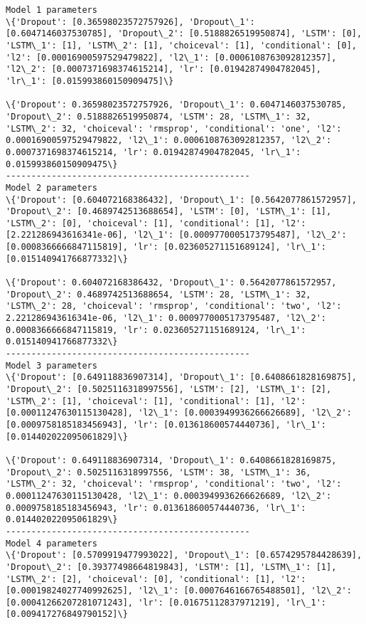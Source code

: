 \documentclass[11pt]{article}
\begin{document}
    \begin{Verbatim}[commandchars=\\\{\}]
Model 1 parameters
\{'Dropout': [0.36598023572757926], 'Dropout\_1': [0.6047146037530785], 'Dropout\_2': [0.5188826519950874], 'LSTM': [0], 'LSTM\_1': [1], 'LSTM\_2': [1], 'choiceval': [1], 'conditional': [0], 'l2': [0.00016900597529479822], 'l2\_1': [0.0006108763092812357], 'l2\_2': [0.0007371698374615214], 'lr': [0.01942874904782045], 'lr\_1': [0.015993860150909475]\}

\{'Dropout': 0.36598023572757926, 'Dropout\_1': 0.6047146037530785, 'Dropout\_2': 0.5188826519950874, 'LSTM': 28, 'LSTM\_1': 32, 'LSTM\_2': 32, 'choiceval': 'rmsprop', 'conditional': 'one', 'l2': 0.00016900597529479822, 'l2\_1': 0.0006108763092812357, 'l2\_2': 0.0007371698374615214, 'lr': 0.01942874904782045, 'lr\_1': 0.015993860150909475\}
------------------------------------------------
Model 2 parameters
\{'Dropout': [0.604072168386432], 'Dropout\_1': [0.5642077861572957], 'Dropout\_2': [0.4689742513688654], 'LSTM': [0], 'LSTM\_1': [1], 'LSTM\_2': [0], 'choiceval': [1], 'conditional': [1], 'l2': [2.221286943616341e-06], 'l2\_1': [0.0009770005173795487], 'l2\_2': [0.0008366666847115819], 'lr': [0.023605271151689124], 'lr\_1': [0.015140941766877332]\}

\{'Dropout': 0.604072168386432, 'Dropout\_1': 0.5642077861572957, 'Dropout\_2': 0.4689742513688654, 'LSTM': 28, 'LSTM\_1': 32, 'LSTM\_2': 28, 'choiceval': 'rmsprop', 'conditional': 'two', 'l2': 2.221286943616341e-06, 'l2\_1': 0.0009770005173795487, 'l2\_2': 0.0008366666847115819, 'lr': 0.023605271151689124, 'lr\_1': 0.015140941766877332\}
------------------------------------------------
Model 3 parameters
\{'Dropout': [0.649118836907314], 'Dropout\_1': [0.6408661828169875], 'Dropout\_2': [0.5025116318997556], 'LSTM': [2], 'LSTM\_1': [2], 'LSTM\_2': [1], 'choiceval': [1], 'conditional': [1], 'l2': [0.00011247630115130428], 'l2\_1': [0.0003949936266626689], 'l2\_2': [0.0009758185183456943], 'lr': [0.013618600574440736], 'lr\_1': [0.014402022095061829]\}

\{'Dropout': 0.649118836907314, 'Dropout\_1': 0.6408661828169875, 'Dropout\_2': 0.5025116318997556, 'LSTM': 38, 'LSTM\_1': 36, 'LSTM\_2': 32, 'choiceval': 'rmsprop', 'conditional': 'two', 'l2': 0.00011247630115130428, 'l2\_1': 0.0003949936266626689, 'l2\_2': 0.0009758185183456943, 'lr': 0.013618600574440736, 'lr\_1': 0.014402022095061829\}
------------------------------------------------
Model 4 parameters
\{'Dropout': [0.5709919477993022], 'Dropout\_1': [0.6574295784428639], 'Dropout\_2': [0.39377498664819843], 'LSTM': [1], 'LSTM\_1': [1], 'LSTM\_2': [2], 'choiceval': [0], 'conditional': [1], 'l2': [0.00019824027740992625], 'l2\_1': [0.0007646166765488501], 'l2\_2': [0.00041266207281071243], 'lr': [0.01675112837971219], 'lr\_1': [0.009417276849790152]\}


\end{Verbatim}
\end{document}

